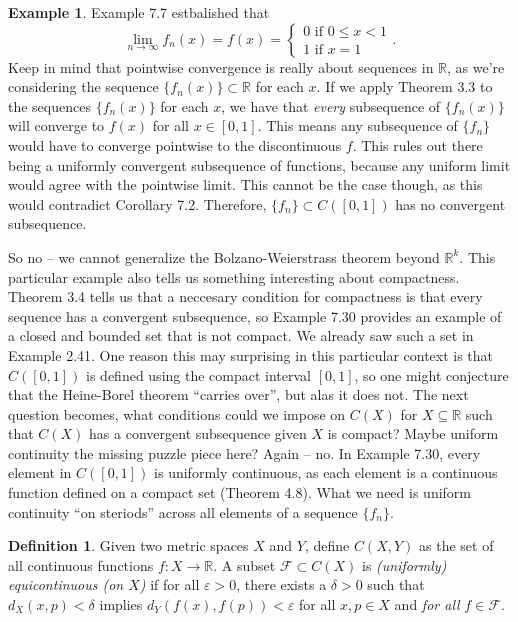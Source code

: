\documentclass{article}
\newcommand{\R}{\mathbb{R}}
\theoremstyle{definition}
\newtheorem{definition}{Definition}[section]
\newtheorem{example}{Example}[section]
\begin{document}
\begin{example}
	Example 7.7 estbalished that $$ \lim\limits_{n\to\infty}f_n(x)=f(x)=\begin{cases}
		0\text{ if } 0\le x<1\\1\text{ if } x=1
	\end{cases} .$$ 
	Keep in mind that pointwise convergence is really about sequences in $\R$, as we're considering the sequence $\{f_n(x)\} \subset \R$ for each $x$. If we apply Theorem 3.3 to the sequences $\{f_n(x)\}$ for each $x$, we have that \textit{every} subsequence of $\{f_n(x)\}$ will converge to $f(x)$ for all $x\in[0,1]$. This means any subsequence of $\{f_n\}$ would have to converge pointwise to the discontinuous $f$. This rules out there being a uniformly convergent subsequence of functions, because any uniform limit would agree with the pointwise limit. This cannot  be the case though, as this would contradict Corollary 7.2. Therefore, $\{f_n\}\subset C([0,1])$ has no convergent subsequence.
	\end{example}
	
	So no -- we cannot generalize the Bolzano-Weierstrass theorem beyond $\R^k$. This particular example also tells us something interesting about compactness. Theorem 3.4 tells us that a neccesary condition for compactness is that every sequence has a convergent subsequence, so Example 7.30 provides an example of a closed and bounded set that is not compact. We already saw such a set in Example 2.41. One reason this may surprising in this particular context is that $C([0,1])$ is defined using the compact interval $[0,1]$, so one might conjecture that the Heine-Borel theorem ``carries over'', but alas it does not. The next question becomes, what conditions could we impose on $C(X)$ for $X\subseteq \R$ such that $C(X)$ has a convergent subsequence given $X$ is compact? Maybe uniform continuity the missing puzzle piece here? Again -- no. In Example 7.30, every element in $C([0,1])$ is uniformly continuous, as each element is a continuous function defined on a compact set (Theorem 4.8). What we need is uniform continuity ``on steriods'' across all elements of a sequence $\{f_n\}$.
	
	\begin{definition}\label{def7.13}
		Given two metric spaces $X$ and $Y$, define $C(X,Y)$ as the set of all continuous functions $f:X\to \R$. A subset $\mathcal F\subset C(X)$ is \textit{\color{red}(uniformly) equicontinuous (on $X$)} if for all $\varepsilon > 0$, there exists a $\delta > 0$ such that $d_X(x,p) < \delta$ implies $d_Y(f(x),f(p))<\varepsilon$ for all $x,p\in X$ and \textit{for all} $f \in \mathcal F$.
	\end{definition}
	
\end{document}
